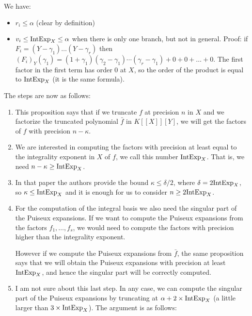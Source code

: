 \documentclass[a4paper,11pt,reqno]{amsart}%
\theoremstyle{definition}
\theoremstyle{plain}
\theoremstyle{remark}
\newcommand\ct[1]{\text{\rmfamily\upshape #1}}
\newcommand{\IntExpX}{\ct{IntExp}_X}
\begin{document}
We have:
\begin{itemize}
\item $r_i \le \alpha$ (clear by definition)
\item $v_i \le \IntExpX \le \alpha$ when there is only one branch, but not in general. Proof: if $F_i = (Y-\gamma_1) \dots (Y-\gamma_r)$ then $(F_i)_Y(\gamma_1) = (1+\gamma_1)(\gamma_2 - \gamma_1)\cdots (\gamma_r - \gamma_1) + 0 + 0 + \dots + 0$. The first factor in the first term has order 0 at $X$, so the order of the product is equal to $\IntExpX$ (it is the same formula).
\end{itemize}


The steps are now as follows:
\begin{enumerate}
\item
This proposition says that if we truncate $f$ at precision $n$ in $X$ and we factorize the truncated polynomial $\bar f$ in $K[[X]][Y]$, we will get the factors of $f$ with precision $n - \kappa$.

\item
We are interested in computing the factors with precision at least equal to the integrality exponent in $X$ of $f$, we call this number $\IntExpX$. That is, we need
$n - \kappa \ge \IntExpX$.

\item In that paper the authors provide the bound $\kappa \le \delta / 2$, where $\delta = 2 \IntExpX$, so $\kappa \le \IntExpX$ and it is enough for us to consider $n \ge 2 \IntExpX$.

\item
For the computation of the integral basis we also need the singular part of the Puiseux expansions. If we want to compute the Puiseux expansions from the factors $f_1, \dots, f_s$, we would need to compute the factors with precision higher than the integrality exponent.

However if we compute the Puiseux expansions from $\bar f$, the same proposition says that we will obtain the Puiseux expansions with precision at least $\IntExpX$, and hence the singular part will be correctly computed.

\item I am not sure about this last step. In any case, we can compute the singular part of the Puiseux expansions by truncating at $\alpha + 2 \times \IntExpX$ (a little larger than $3 \times \IntExpX$). The argument is as follows:


\end{enumerate}
\end{document}
